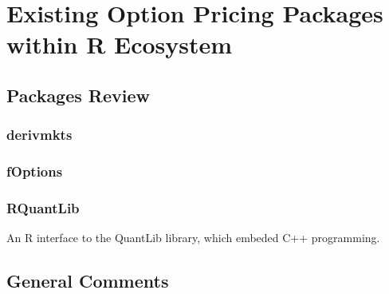 \chapter{Existing Option Pricing Packages within R Ecosystem}

\section{Packages Review}

\subsection{derivmkts}


\subsection{fOptions}

\subsection{RQuantLib}

An R interface to the QuantLib library, which embeded C++ programming.

\section{General Comments}

